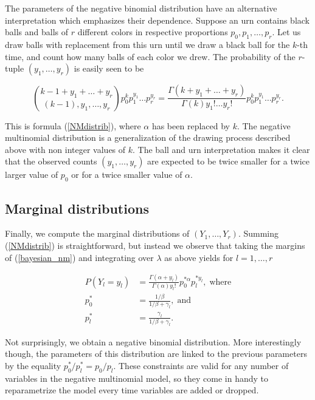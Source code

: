 \documentclass[12pt]{article}
\begin{document}
\begin{appendices}
    The parameters of the negative binomial distribution have
    an alternative interpretation which emphasizes their dependence.
    Suppose an urn contains black balls and balls of $r$ different
    colors in respective proportions $p_0, p_1, \ldots, p_r$. Let
    us draw balls with replacement from this urn until we draw
    a black ball for the $k$-th time, and count how many balls of
    each color we drew. The probability of the $r$-tuple
    $(y_1, \ldots, y_r)$ is easily seen to be

    \begin{equation*}
    {k-1+y_1+\ldots+y_r \choose (k-1), y_1, \ldots, y_r}
      p_0^k p_1^{y_1} \ldots p_r^{y_r} =
    \frac{\Gamma(k+y_1+\ldots+y_r)}{\Gamma(k)y_1! \ldots y_r!}
      p_0^k p_1^{y_1} \ldots p_r^{y_r}.
    \end{equation*}

    This is formula (\ref{NMdistrib}), where $\alpha$ has
    been replaced by $k$. The negative multinomial distribution is
    a generalization of the drawing process described above with
    non integer values of $k$. The ball and urn interpretation
    makes it clear that the observed counts $(y_1, \ldots, y_r)$
    are expected to be twice smaller for a twice larger value of
    $p_0$ or for a twice smaller value of $\alpha$.
    

\subsection{Marginal distributions}
\label{subsection_marginal_nm}

    Finally, we compute the marginal distributions of
    $(Y_1, \ldots, Y_r)$. Summing (\ref{NMdistrib}) is straightforward,
    but instead we observe that taking the margins of (\ref{bayesian_nm})
    and integrating over $\lambda$ as above yields for
    $l = 1, \ldots, r$

    \begin{align*}
    P(Y_l = y_l) &= \frac{\Gamma(\alpha+y_l)}{\Gamma(\alpha)y_l!}
      p_0^{*\alpha} p_l^{*y_l}, \; \text{where} \\
    p_0^* &= \frac{1/\beta}{1/\beta + \gamma_l}, \; \text{and} \\
    p_l^* &= \frac{\gamma_l}{1/\beta + \gamma_l}.
    \end{align*}
    
    Not surprisingly, we obtain a negative binomial distribution.
    More interestingly though, the parameters of this
    distribution are linked to the previous parameters
    by the equality $p_0^* / p_l^* = p_0 / p_l$. These constraints
    are valid for any number of variables in the negative
    multinomial model, so they come in handy to reparametrize the
    model every time variables are added or dropped.


\end{appendices}
\end{document}
